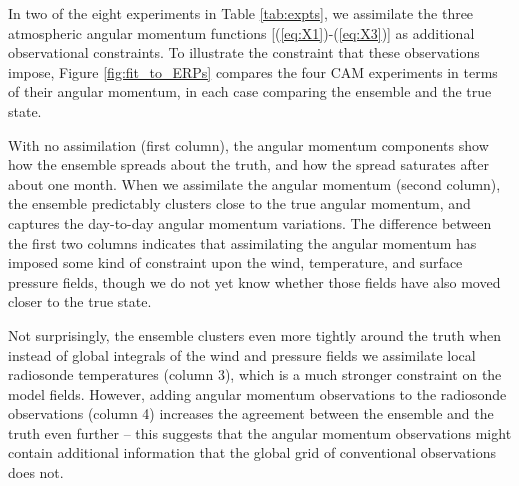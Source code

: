 In two of the eight experiments in Table \ref{tab:expts}, we assimilate the three atmospheric angular momentum functions [(\ref{eq:X1})-(\ref{eq:X3})] as additional observational constraints.
To illustrate the constraint that these observations impose, Figure \ref{fig:fit_to_ERPs} compares the four CAM experiments in terms of their angular momentum, in each case comparing the ensemble and the true state.

With no assimilation (first column), the angular momentum components show how the ensemble spreads about the truth, and how the spread saturates after about one month.
When we assimilate the angular momentum (second column), the ensemble predictably clusters close to the true angular momentum, and captures the day-to-day angular momentum variations. 
The difference between the first two columns indicates that assimilating the angular momentum has imposed some kind of constraint upon the wind, temperature, and surface pressure fields, though we do not yet know whether those fields have also moved closer to the true state. 

Not surprisingly, the ensemble clusters even more tightly around the truth when instead of global integrals of the wind and pressure fields we assimilate local radiosonde temperatures (column 3), which is a much stronger constraint on the model fields. 
However, adding angular momentum observations to the radiosonde observations (column 4) increases the agreement between the ensemble and the truth even further -- this suggests that the angular momentum observations might contain additional information that the global grid of conventional observations does not.  



